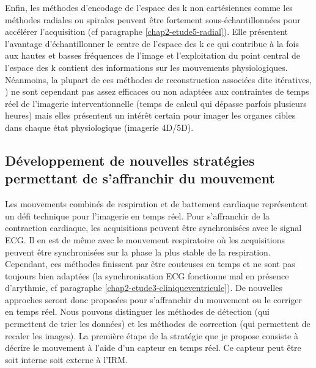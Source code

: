 
Enfin, les méthodes d’encodage de l’espace des k non cartésiennes comme les méthodes radiales ou spirales \cite{wright20143d} peuvent être fortement sous-échantillonnées pour accélérer l’acquisition (cf paragraphe \ref{chap2-etude5-radial}). Elle présentent l’avantage d’échantillonner le centre de l’espace des k ce qui contribue à la fois aux hautes et basses fréquences de l’image et l’exploitation du point central de l’espace des k contient des informations sur les mouvements physiologiques. Néanmoins, la plupart de ces méthodes de reconstruction associées dite itératives, \cite{lustig2007sparse}) ne sont cependant pas assez efficaces ou non adaptées aux contraintes de temps réel de l’imagerie interventionnelle (temps de calcul qui dépasse parfois plusieurs heures) mais elles présentent un intérêt certain pour imager les organes cibles dans chaque état physiologique (imagerie 4D/5D). 

\subsection{Développement de nouvelles stratégies permettant de s'affranchir du mouvement}

Les mouvements combinés de respiration et de battement cardiaque représentent un défi technique pour l’imagerie en temps réel. Pour s’affranchir de la contraction cardiaque, les acquisitions peuvent être synchronisées avec le signal \ac{ECG}. Il en est de même avec le mouvement respiratoire où les acquisitions peuvent être synchronisées sur la phase la plus stable de la respiration. Cependant, ces méthodes finissent par être couteuses en temps et ne sont pas toujours bien adaptées (la synchronisation ECG fonctionne mal en présence d’arythmie, cf paragraphe \ref{chap2-etude3-cliniqueventricule}). De nouvelles approches seront donc proposées pour s’affranchir du mouvement ou le corriger en temps réel. Nous pouvons distinguer les méthodes de détection (qui permettent de trier les données) et les méthodes de correction (qui permettent de recaler les images). La première étape de la stratégie que je propose consiste à décrire le mouvement à l’aide d'un capteur en temps réel. Ce capteur peut être soit interne soit externe à l’IRM.\\

